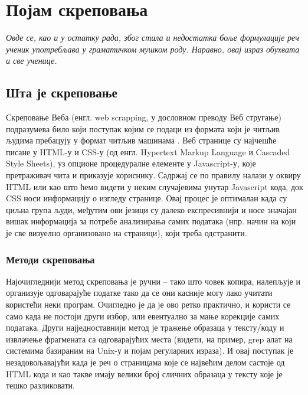\chapter{Појам скреповања}\label{ch:\thechapter}
\vspace*{-8mm}
\textit{Овде се, као и у остатку рада, због стила и недостатка боље формулације реч ученик употребљава у граматичком мушком роду. Наравно, овај израз обухвата и све ученице.} %
\vspace{5mm}

\section{Шта је скреповање}

Скреповање Веба (енгл. web scrapping, у дословном преводу Веб стругање) подразумева било који поступак којим се подаци из формата који је читљив људима пребацују у формат читљив машинама \citep{boeing2017new}. Веб странице су најчешће писане у HTML-у и CSS-у (од енгл. Hypertext Markup Language и Cascaded Style Sheets), уз опционе процедуралне елементе у Javascript-у, које претраживач чита и приказује кориснику. Садржај се по правилу налази у оквиру HTML или као што ћемо видети у неким случајевима унутар Javascript кода, док CSS носи информацију о изгледу странице. Овај процес је оптималан када су циљна група људи, међутим ови језици су далеко експресивнији и носе значајан вишак информација за потребе анализирања самих података (нпр. начин на који је све визуелно организовано на страници), који треба одстранити. 

\subsection{Методи скреповања}

Најочигледнији метод скреповања је ручни -- тако што човек копира, налепљује и организује одговарајуће податке тако да се они касније могу лако учитати користећи неки програм. Очигледно је да је ово ретко практично, и користи се само када не постоји други избор, или евентуално за мање корекције самих података. Други најједноставнији метод је тражење образаца у тексту/коду и извлачење фрагмената са одговарајућих места (видети, на пример, grep алат на системима базираним на Unix-у и појам регуларних израза). И овај поступак је незадовољавајући када је реч о страницама које се највећим делом састоје од HTML кода и као такве имају велики број сличних образаца у тексту које је тешко разликовати. 

